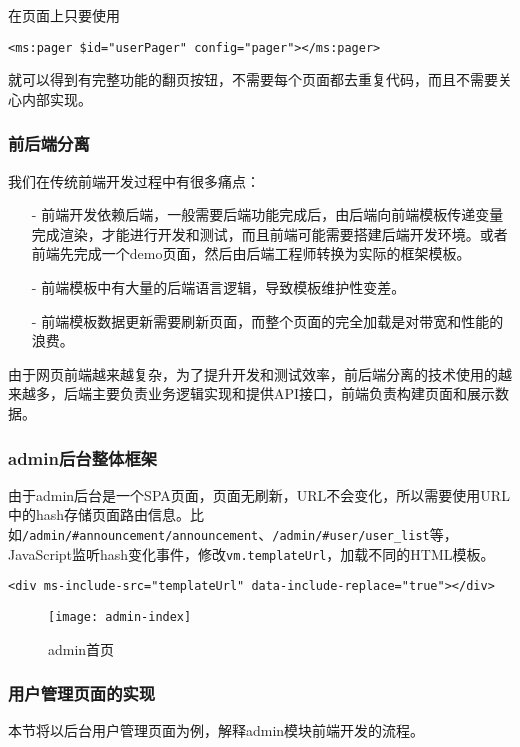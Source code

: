 在页面上只要使用
\begin{verbatim}
<ms:pager $id="userPager" config="pager"></ms:pager>
\end{verbatim}就可以得到有完整功能的翻页按钮，不需要每个页面都去重复代码，而且不需要关心内部实现。

\subsubsection{前后端分离}

我们在传统前端开发过程中有很多痛点：

\begin{itemize}
\item[-] 前端开发依赖后端，一般需要后端功能完成后，由后端向前端模板传递变量完成渲染，才能进行开发和测试，而且前端可能需要搭建后端开发环境。或者前端先完成一个demo页面，然后由后端工程师转换为实际的框架模板。
\item[-] 前端模板中有大量的后端语言逻辑，导致模板维护性变差。
\item[-] 前端模板数据更新需要刷新页面，而整个页面的完全加载是对带宽和性能的浪费。
\end{itemize}

由于网页前端越来越复杂，为了提升开发和测试效率，前后端分离的技术使用的越来越多，后端主要负责业务逻辑实现和提供API接口，前端负责构建页面和展示数据。

\subsubsection{admin后台整体框架}
由于admin后台是一个SPA页面，页面无刷新，URL不会变化，所以需要使用URL中的hash存储页面路由信息。比如\texttt{/admin/\#announcement/announcement}、\texttt{/admin/\#user/user\_list}等，JavaScript监听hash变化事件，修改\texttt{vm.templateUrl}，加载不同的HTML模板。

\begin{verbatim}
<div ms-include-src="templateUrl" data-include-replace="true"></div>
\end{verbatim}

\begin{figure}[H]
\centering
\texttt{[image: admin-index]}
\caption{admin首页}
\end{figure}

\subsubsection{用户管理页面的实现}
本节将以后台用户管理页面为例，解释admin模块前端开发的流程。

